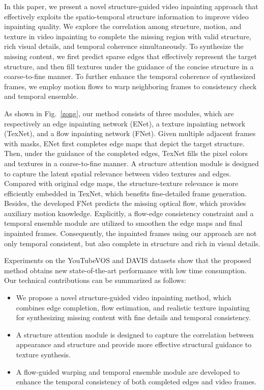 In this paper, we present a novel structure-guided video inpainting approach that effectively exploits the spatio-temporal structure information to improve video inpainting quality.  
We explore the correlation among structure, motion, and texture in video inpainting to complete the missing region with valid structure, rich visual details, and temporal coherence simultaneously.
%
To synthesize the missing content, we first predict sparse edges that effectively represent the target structure, and then fill textures under the guidance of the concise structure in a coarse-to-fine manner.
To further enhance the temporal coherence of synthesized frames, we employ motion flows to warp neighboring frames to consistency check and temporal ensemble. 



As shown in Fig.~\ref{zong}, our method consists of three modules, which are respectively an edge inpainting network (ENet), a texture inpainting network (TexNet), and a flow inpainting network (FNet).
%
Given multiple adjacent frames with masks, ENet first completes edge maps that depict the target structure. 
Then, under the guidance of the completed edges, TexNet fills the pixel colors and textures in a coarse-to-fine manner.
A structure attention module is designed to capture the latent spatial relevance between video textures and edges.
Compared with original edge maps, the structure-texture relevance is more efficiently embedded in TexNet, which benefits fine-detailed frame generation.
Besides, the developed FNet predicts the missing optical flow, which provides auxiliary motion knowledge. 
Explicitly, a flow-edge consistency constraint and a temporal ensemble module are utilized to smoothen the edge maps and final inpainted frames. 
Consequently, the inpainted frames using our approach are not only temporal consistent, but also complete in structure and rich in visual details.
 

%
Experiments on the YouTubeVOS and DAVIS datasets show that the proposed method obtains new state-of-the-art performance with low time consumption.
%
Our technical contributions can be summarized as follows:
\begin{itemize}
	\item We propose a novel structure-guided video inpainting method, which combines edge completion, flow estimation, and realistic texture inpainting for synthesizing missing content with fine details and temporal consistency.
	\item A structure attention module is designed to capture the correlation between appearance and structure and provide more effective structural guidance to texture synthesis.
	\item A flow-guided warping and temporal ensemble module are developed to enhance the temporal consistency of both completed edges and video frames.   
\end{itemize}





